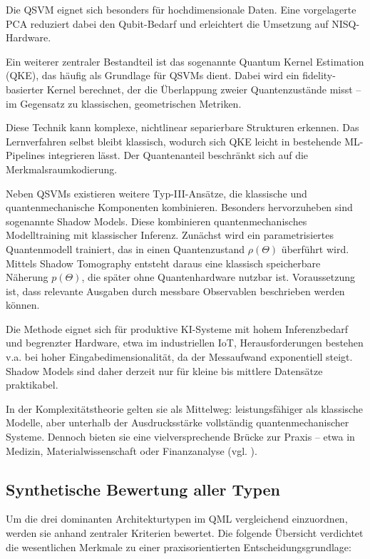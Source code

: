 Die QSVM eignet sich besonders für hochdimensionale Daten. Eine vorgelagerte PCA reduziert dabei den Qubit-Bedarf und erleichtert die Umsetzung auf NISQ-Hardware. 

Ein weiterer zentraler Bestandteil ist das sogenannte Quantum Kernel Estimation (QKE), das häufig als Grundlage für QSVMs dient. Dabei wird ein fidelity-basierter Kernel berechnet, der die Überlappung zweier Quantenzustände misst – im Gegensatz zu klassischen, geometrischen Metriken.

Diese Technik kann komplexe, nichtlinear separierbare Strukturen erkennen. Das Lernverfahren selbst bleibt klassisch, wodurch sich QKE leicht in bestehende ML-Pipelines integrieren lässt. Der Quantenanteil beschränkt sich auf die Merkmalsraumkodierung. 

Neben QSVMs existieren weitere Typ-III-Ansätze, die klassische und quantenmechanische Komponenten kombinieren. Besonders hervorzuheben sind sogenannte Shadow Models. Diese kombinieren quantenmechanisches Modelltraining mit klassischer Inferenz. Zunächst wird ein parametrisiertes Quantenmodell trainiert, das in einen Quantenzustand $\rho(\Theta)$ überführt wird. Mittels Shadow Tomography entsteht daraus eine klassisch speicherbare Näherung $p(\Theta)$, die später ohne Quantenhardware nutzbar ist. Voraussetzung ist, dass relevante Ausgaben durch messbare Observablen beschrieben werden können.

Die Methode eignet sich für produktive KI-Systeme mit hohem Inferenzbedarf und begrenzter Hardware, etwa im industriellen IoT,
Herausforderungen bestehen v.a. bei hoher Eingabedimensionalität, da der Messaufwand exponentiell steigt. Shadow Models sind daher derzeit nur für kleine bis mittlere Datensätze praktikabel.

In der Komplexitätstheorie gelten sie als Mittelweg: leistungsfähiger als klassische Modelle, aber unterhalb der Ausdrucksstärke vollständig quantenmechanischer Systeme. Dennoch bieten sie eine vielversprechende Brücke zur Praxis – etwa in Medizin, Materialwissenschaft oder Finanzanalyse
(vgl. \cite{jerbiShadowsQuantumMachine2024}).


\vspace{1.5em}
\subsection{Synthetische Bewertung aller Typen}


Um die drei dominanten Architekturtypen im QML vergleichend einzuordnen, werden sie anhand zentraler Kriterien bewertet. Die folgende Übersicht verdichtet die wesentlichen Merkmale zu einer praxisorientierten Entscheidungsgrundlage:


